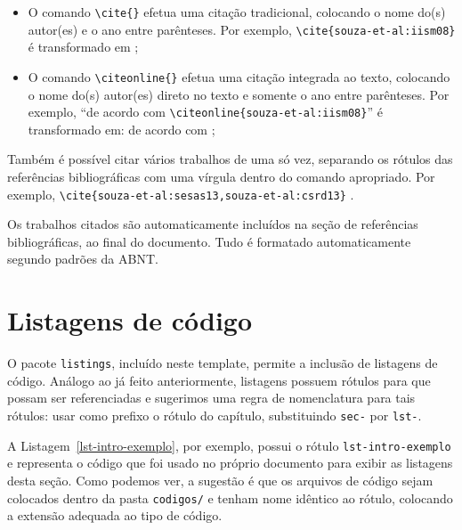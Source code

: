 \begin{itemize}
	\item O comando \texttt{\textbackslash cite\{\}} efetua uma citação tradicional, colocando o nome do(s) autor(es) e o ano entre parênteses. Por exemplo, \texttt{\textbackslash cite\{souza-et-al:iism08\}} é transformado em \cite{souza-et-al:iism08};
	
	\item O comando \texttt{\textbackslash citeonline\{\}} efetua uma citação integrada ao texto, colocando o nome do(s) autor(es) direto no texto e somente o ano entre parênteses. Por exemplo, ``de acordo com \texttt{\textbackslash citeonline\{souza-et-al:iism08\}}'' é transformado em: de acordo com ;
\end{itemize}

Também é possível citar vários trabalhos de uma só vez, separando os rótulos das referências bibliográficas com uma vírgula dentro do comando apropriado. Por exemplo, \texttt{\textbackslash cite\{souza-et-al:sesas13,souza-et-al:csrd13\}} \cite{souza-et-al:sesas13,souza-et-al:csrd13}.

Os trabalhos citados são automaticamente incluídos na seção de referências bibliográficas, ao final do documento. Tudo é formatado automaticamente segundo padrões da ABNT.



\section{Listagens de código}
\label{sec-intro-listagens}

O pacote \texttt{listings}, incluído neste template, permite a inclusão de listagens de código. Análogo ao já feito anteriormente, listagens possuem rótulos para que possam ser referenciadas e sugerimos uma regra de nomenclatura para tais rótulos: usar como prefixo o rótulo do capítulo, substituindo \texttt{sec-} por \texttt{lst-}.

A Listagem~\ref{lst-intro-exemplo}, por exemplo, possui o rótulo \texttt{lst-intro-exemplo} e representa o código que foi usado no próprio documento para exibir as listagens desta seção. Como podemos ver, a sugestão é que os arquivos de código sejam colocados dentro da pasta \texttt{codigos/} e tenham nome idêntico ao rótulo, colocando a extensão adequada ao tipo de código.



